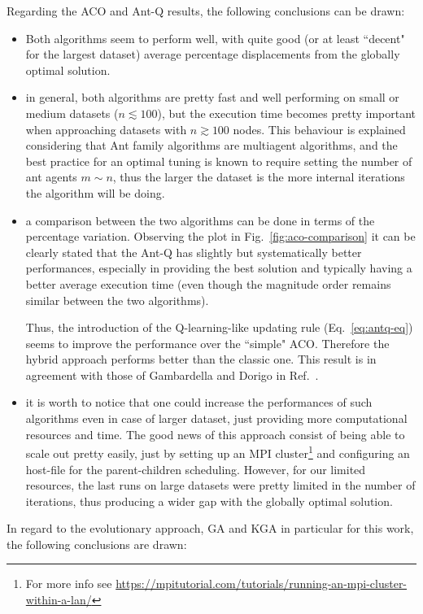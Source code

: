 \documentclass[10pt]{article}
\begin{document}
Regarding the ACO and Ant-Q results, the following conclusions can be drawn:
\begin{itemize}
\item Both algorithms seem to perform well, with quite good (or at least ``decent" for the largest dataset) average percentage displacements from the globally optimal solution.

\item in general, both algorithms are pretty fast and well performing on small or medium datasets ($n \lesssim 100$), but the execution time becomes pretty important when approaching datasets with $n \gtrsim 100$ nodes. This behaviour is explained considering that Ant family algorithms are multiagent algorithms, and the best practice for an optimal tuning is known to require setting the number of ant agents $m \sim n$, thus the larger the dataset is the more internal iterations the algorithm will be doing.

\item a comparison between the two algorithms can be done in terms of the percentage variation. Observing the plot in Fig.~\ref{fig:aco-comparison} it can be clearly stated that the Ant-Q has slightly but systematically better performances, especially in providing the best solution and typically having a better average execution time (even though the magnitude order remains similar between the two algorithms).

Thus, the introduction of the Q-learning-like updating rule (Eq.~\ref{eq:antq-eq}) seems to improve the performance over the ``simple" ACO. Therefore the hybrid approach performs better than the classic one. 
This result is in agreement with those of Gambardella and Dorigo in Ref.~\cite{undici}.

\item it is worth to notice that one could increase the performances of such algorithms even in case of larger dataset, just providing more computational resources and time. 
The good news of this approach consist of being able to scale out pretty easily, just by setting up an MPI cluster\footnote{For more info see \url{https://mpitutorial.com/tutorials/running-an-mpi-cluster-within-a-lan/}} and configuring an host-file for the parent-children scheduling.
However, for our limited resources, the last runs on large datasets were pretty limited in the number of iterations, thus producing a wider gap with the globally optimal solution.
\end{itemize}
In regard to  the evolutionary approach, GA and KGA in particular for this work, the following conclusions are drawn:
\end{document}
